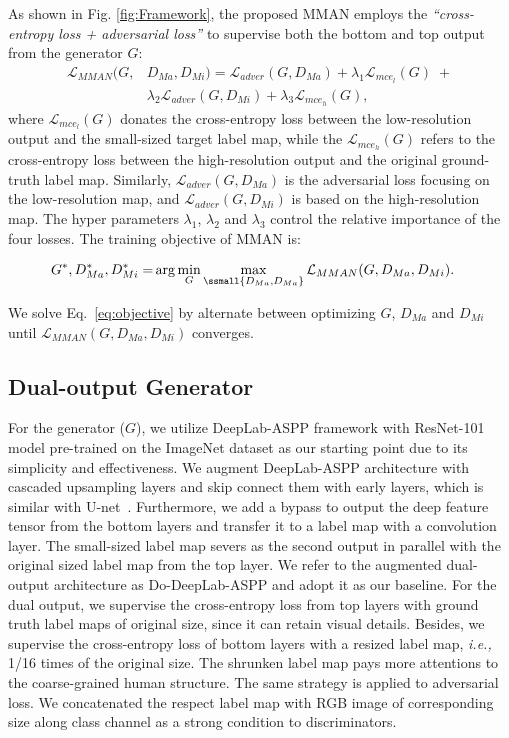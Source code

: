 \documentclass[runningheads]{llncs}
\begin{document}
As shown in Fig. \ref{fig:Framework}, the proposed MMAN employs the \emph{``cross-entropy loss + adversarial loss''} to supervise both the bottom and top output from the generator $G$:
\begin{align}
    \mathcal{L}_{MMAN}(G, &D_{Ma}, D_{Mi}) = \mathcal{L}_{adver}(G,D_{Ma}) + \lambda_{1} \mathcal{L}_{mce_{l}}(G) \;+ \nonumber \\
     &\lambda_{2} \mathcal{L}_{adver}(G,D_{Mi}) + \lambda_{3} \mathcal{L}_{mce_{h}}(G),\label{eq:total}
\end{align}
where $\mathcal{L}_{mce_l}(G)$ donates the cross-entropy loss between the low-resolution output and the small-sized target label map, while the $\mathcal{L}_{mce_h}(G)$ refers to the cross-entropy loss between the high-resolution output and the original ground-truth label map.
Similarly, $\mathcal{L}_{adver}(G,D_{Ma})$ is the adversarial loss focusing on the low-resolution map, and $\mathcal{L}_{adver}(G,D_{Mi})$ is based on the high-resolution map.
The hyper parameters $\lambda_{1}$, $\lambda_{2}$ and $\lambda_{3}$  control the relative importance of the four losses. The training objective of MMAN is:

\begin{align}
G^*, D_{Ma}^*, D_{Mi}^* = &\arg\min_G\max_{\ssmall{D_{Ma}, D_{Ma}}} \mathcal{L}_{MMAN}(G, D_{Ma}, D_{Mi}).\label{eq:objective}
\end{align}

We solve Eq.~\ref{eq:objective} by alternate between optimizing $G$, $D_{Ma}$ and $D_{Mi}$ until $\mathcal{L}_{MMAN}(G, D_{Ma}, D_{Mi})$ converges.

\subsection{Dual-output Generator}\label{sec:baseline}
For the generator ($G$), we utilize DeepLab-ASPP \cite{chen2016deeplab} framework with ResNet-101 \cite{he2016deep} model pre-trained on the ImageNet dataset \cite{deng2009imagenet} as our starting point due to its simplicity and effectiveness. We augment DeepLab-ASPP architecture with cascaded upsampling layers and skip connect them with early layers, which is similar with U-net~\cite{ronneberger2015u}. Furthermore, we add a bypass to output the deep feature tensor from the bottom layers and transfer it to a label map with a convolution layer. The small-sized label map severs as the second output in parallel with the original sized label map from the top layer. We refer to the augmented dual-output architecture as Do-DeepLab-ASPP and adopt it as our baseline. For the dual output, we supervise the cross-entropy loss from top layers with ground truth label maps of original size, since it can retain visual details. Besides, we supervise the cross-entropy loss of bottom layers with a resized label map, \emph{i.e.,} 1/16 times of the original size. The shrunken label map pays more attentions to the coarse-grained human structure. The same strategy is applied to adversarial loss. We concatenated the respect label map with RGB image of corresponding size along class channel as a strong condition to discriminators.
\end{document}
